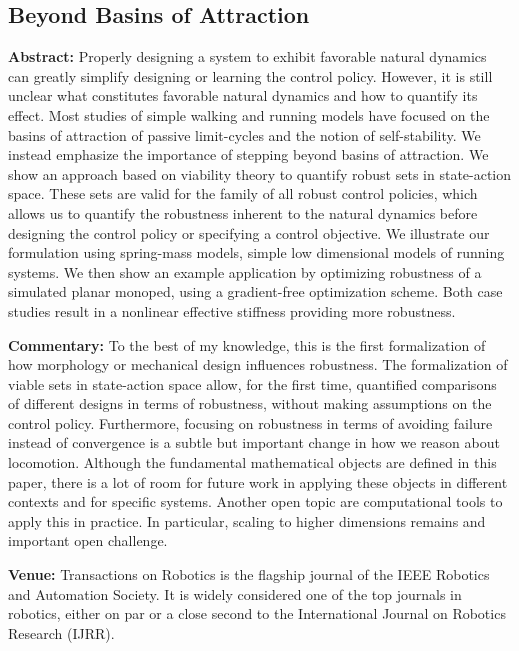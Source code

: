 \subsection{Beyond Basins of Attraction}
\textbf{Abstract: }
Properly designing a system to exhibit favorable natural dynamics can greatly simplify designing or learning the control policy. However, it is still unclear what constitutes favorable natural dynamics and how to quantify its effect. Most studies of simple walking and running models have focused on the basins of attraction of passive limit-cycles and the notion of self-stability. We instead emphasize the importance of stepping beyond basins of attraction. We show an approach based on viability theory to quantify robust sets in state-action space. These sets are valid for the family of all robust control policies, which allows us to quantify the robustness inherent to the natural dynamics before designing the control policy or specifying a control objective.
We illustrate our formulation using spring-mass models, simple low dimensional models of running systems. We then show an example application by optimizing robustness of a simulated planar monoped, using a gradient-free optimization scheme. Both case studies result in a nonlinear effective stiffness providing more robustness. \par
\textbf{Commentary: }
To the best of my knowledge, this is the first formalization of how morphology or mechanical design influences robustness. The formalization of viable sets in state-action space allow, for the first time, quantified comparisons of different designs in terms of robustness, without making assumptions on the control policy. Furthermore, focusing on robustness in terms of avoiding failure instead of convergence is a subtle but important change in how we reason about locomotion. Although the fundamental mathematical objects are defined in this paper, there is a lot of room for future work in applying these objects in different contexts and for specific systems. Another open topic are computational tools to apply this in practice. In particular, scaling to higher dimensions remains and important open challenge. %

\textbf{Venue: }
Transactions on Robotics is the flagship journal of the IEEE Robotics and Automation Society. It is widely considered one of the top journals in robotics, either on par or a close second to the International Journal on Robotics Research (IJRR).

